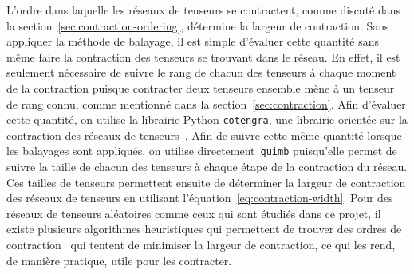 L'ordre dans laquelle les réseaux de tenseurs se contractent, comme discuté dans la section~\ref{sec:contraction-ordering}, détermine la largeur de contraction.
Sans appliquer la méthode de balayage, il est simple d'évaluer cette quantité sans même faire la contraction des tenseurs se trouvant dans le réseau.
En effet, il est seulement nécessaire de suivre le rang de chacun des tenseurs à chaque moment de la contraction puisque contracter deux tenseurs ensemble mène à un tenseur de rang connu, comme mentionné dans la section~\ref{sec:contraction}.
Afin d'évaluer cette quantité, on utilise la librairie Python \verb|cotengra|, une librairie orientée sur la contraction des réseaux de tenseurs~\cite{gray_hyper-optimized_2021}.
Afin de suivre cette même quantité lorsque les balayages sont appliqués, on utilise directement~\verb|quimb| puisqu'elle permet de suivre la taille de chacun des tenseurs à chaque étape de la contraction du réseau.
Ces tailles de tenseurs permettent ensuite de déterminer la largeur de contraction des réseaux de tenseurs en utilisant l'équation~\ref{eq:contraction-width}.
Pour des réseaux de tenseurs aléatoires comme ceux qui sont étudiés dans ce projet, il existe plusieurs algorithmes heuristiques qui permettent de trouver des ordres de contraction~\cite{gray_hyper-optimized_2021, gray_hyper-optimized_2022} qui tentent de minimiser la largeur de contraction, ce qui les rend, de manière pratique, utile pour les contracter.

